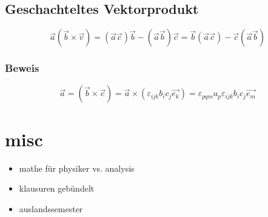 \documentclass[a4paper]{scrartcl}
\begin{document}
\subsection{Geschachteltes Vektorprodukt}
\label{sec-13-6}
\[\vec{a}(\vec{b}\times\vec{v})=(\vec{a}\vec{c})\vec{b}-(\vec{a}\vec{b})\vec{c}=\vec{b}(\vec{a}\vec{c})-\vec{c}(\vec{a}\vec{b})\]
\subsubsection{Beweis}
\label{sec-13-6-1}
\[\vec{a}=(\vec{b}\times\vec{c})=\vec{a}\times(\varepsilon_{ijk}b_i c_j \vec{e_k})=\varepsilon_{pqm}a_p\varepsilon_{ijk}b_i c_j \vec{e_m}\]
\section{misc}
\label{sec-14}
\begin{itemize}
\item mathe für physiker vs. analysis
\item klausuren gebündelt
\item auslandssemester
\end{itemize}
\end{document}
